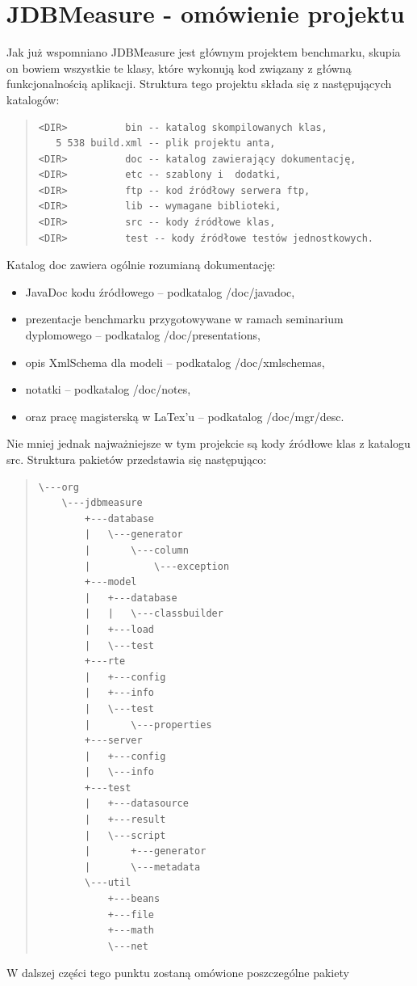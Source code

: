 \section{JDBMeasure - omówienie projektu}
Jak już wspomniano JDBMeasure jest głównym projektem benchmarku, skupia on bowiem wszystkie te klasy,
które wykonują kod związany z główną funkcjonalnością aplikacji. Struktura tego projektu składa się 
z następujących katalogów:
\begin{quote}
\begin{Verbatim}
<DIR>          bin -- katalog skompilowanych klas,
   5 538 build.xml -- plik projektu anta,
<DIR>          doc -- katalog zawierający dokumentację, 
<DIR>          etc -- szablony i  dodatki,
<DIR>          ftp -- kod źródłowy serwera ftp,
<DIR>          lib -- wymagane biblioteki,
<DIR>          src -- kody źródłowe klas,
<DIR>          test -- kody źródłowe testów jednostkowych.
\end{Verbatim}
\end{quote}
Katalog doc zawiera ogólnie rozumianą dokumentację:
\begin{itemize}
\item JavaDoc kodu źródłowego -- podkatalog /doc/javadoc,
\item prezentacje benchmarku przygotowywane w ramach seminarium dyplomowego -- podkatalog /doc/presentations,
\item opis XmlSchema dla modeli -- podkatalog /doc/xmlschemas,
\item notatki -- podkatalog /doc/notes,
\item oraz pracę magisterską w LaTex'u -- podkatalog /doc/mgr/desc.
\end{itemize}
Nie mniej jednak najważniejsze w tym projekcie są kody źródłowe klas z katalogu src. 
Struktura pakietów przedstawia się następująco:
\begin{quote}
\begin{Verbatim}
\---org
    \---jdbmeasure
        +---database
        |   \---generator
        |       \---column
        |           \---exception
        +---model
        |   +---database
        |   |   \---classbuilder
        |   +---load
        |   \---test
        +---rte
        |   +---config
        |   +---info
        |   \---test
        |       \---properties
        +---server
        |   +---config
        |   \---info
        +---test
        |   +---datasource
        |   +---result
        |   \---script
        |       +---generator
        |       \---metadata
        \---util
            +---beans
            +---file
            +---math
            \---net\end{Verbatim}
\end{quote}
W dalszej części tego punktu zostaną omówione poszczególne pakiety
